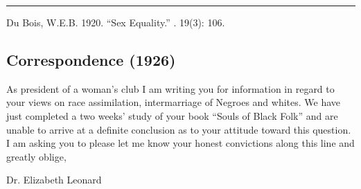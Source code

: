 \documentclass[letterpaper,10pt,english]{jupyterBook}
\begin{document}
\bigskip\hrule\bigskip


\sphinxAtStartPar
{} Du Bois, W.E.B. 1920. “Sex Equality.” . 19(3): 106.


\subsection{Correspondence (1926)}
\label{\detokenize{Volumes/31/05/correspondence:correspondence-1926}}\label{\detokenize{Volumes/31/05/correspondence::doc}}
\sphinxAtStartPar
{}

\sphinxAtStartPar
As president of a woman’s club I am writing you for information in regard to your views on race assimilation, intermarriage of Negroes and whites. We have just completed a two weeks’ study of your book “Souls of Black Folk” and are unable to arrive at a definite conclusion as to your attitude toward this question. I am asking you to please let me know your honest convictions along this line and greatly oblige,

\sphinxAtStartPar
Dr. Elizabeth Leonard
\end{document}
